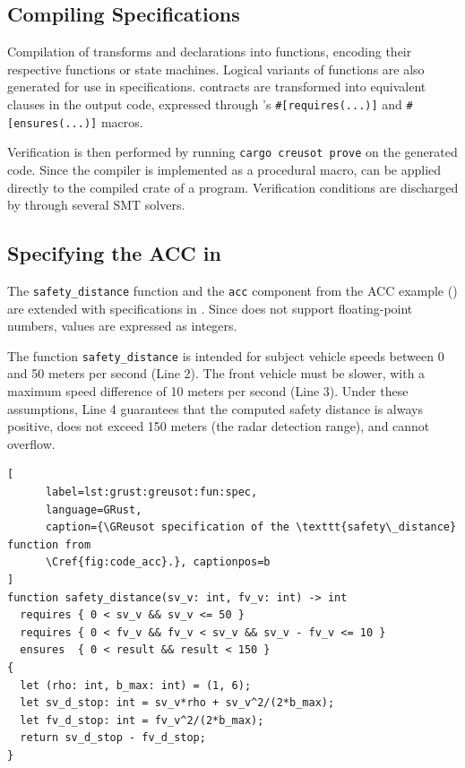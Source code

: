 \subsection{Compiling \GReusot Specifications}
\label{sec:grust:greusot:compil}

Compilation of \GRust transforms  and  declarations into \Rust
functions, encoding their respective functions or state machines. Logical variants of functions are
also generated for use in specifications. \GReusot contracts are transformed into equivalent
\Creusot clauses in the output \Rust code, expressed through \Creusot's \texttt{\#[requires(...)]}
and \texttt{\#[ensures(...)]} macros.

Verification is then performed by running \texttt{cargo creusot prove} on the generated code. Since
the \GRust compiler is implemented as a \Rust procedural macro, \Creusot can be applied directly to
the compiled crate of a \GRust program. Verification conditions are discharged by \Creusot through
several SMT solvers.

\subsection{Specifying the ACC in \GReusot}
\label{sec:grust:greusot:example}

The \verb|safety_distance| function and the \verb|acc| component from the ACC example
() are extended with \GReusot specifications in
. Since \Creusot does not support
floating-point numbers, values are expressed as integers.

The function \verb|safety_distance| is intended for subject vehicle speeds between 0 and 50 meters
per second (Line 2). The front vehicle must be slower, with a maximum speed difference of 10 meters
per second (Line 3). Under these assumptions, Line 4 guarantees that the computed safety distance is
always positive, does not exceed 150 meters (the radar detection range), and cannot overflow.

\begin{lstlisting}[
      label=lst:grust:greusot:fun:spec,
      language=GRust, 
      caption={\GReusot specification of the \texttt{safety\_distance} function from 
      \Cref{fig:code_acc}.}, captionpos=b
]
function safety_distance(sv_v: int, fv_v: int) -> int
  requires { 0 < sv_v && sv_v <= 50 }
  requires { 0 < fv_v && fv_v < sv_v && sv_v - fv_v <= 10 }
  ensures  { 0 < result && result < 150 }
{
  let (rho: int, b_max: int) = (1, 6);
  let sv_d_stop: int = sv_v*rho + sv_v^2/(2*b_max);
  let fv_d_stop: int = fv_v^2/(2*b_max);
  return sv_d_stop - fv_d_stop;
}
\end{lstlisting}

